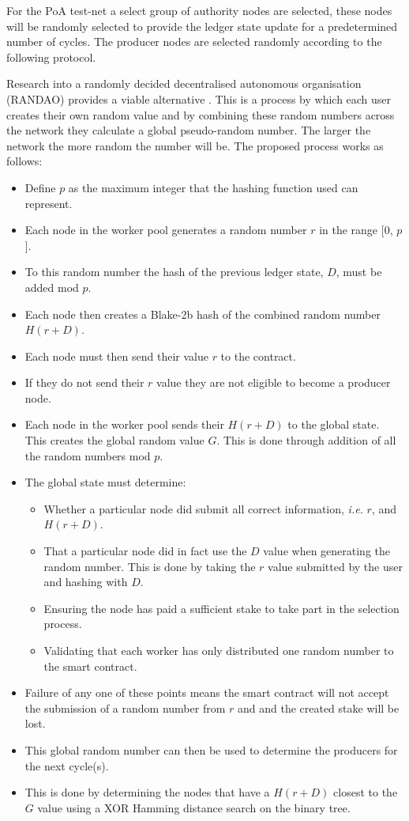 For the PoA test-net a select group of authority nodes are selected, these nodes will be randomly selected to provide the ledger state update for a predetermined number of cycles. The producer nodes are selected randomly according to the following protocol. 

Research into a randomly decided decentralised autonomous organisation (RANDAO) provides a viable alternative \cite{skvorc}\cite{randao}. This is a process by which each user creates their own random value and by combining these random numbers across the network they calculate a global pseudo-random number. The larger the network the more random the number will be. The proposed process works as follows: \\

\begin{itemize}

\item Define $p$ as the maximum integer that the hashing function used can represent.
\item Each node in the worker pool generates a random number $r$ in the range [0, $p$].
\item To this random number the hash of the previous ledger state, $D$, must be added mod $p$.
\item Each node then creates a Blake-2b hash of the combined random number $H(r + D)$.
\item Each node must then send their value $r$ to the contract.
\item If they do not send their $r$ value they are not eligible to become a producer node.
\item Each node in the worker pool sends their $H(r + D)$ to the global state. This creates the global random value $G$. This is done through addition of all the random numbers mod $p$.
\item The global state must determine:
\begin{itemize}
\item Whether a particular node did submit all correct information, \textit{i.e.} $r$, and $H(r+D)$.
\item That a particular node did in fact use the $D$ value when generating the random number. This is done by taking the $r$ value submitted by the user and hashing with $D$.
\item Ensuring the node has paid a sufficient stake to take part in the selection process.
\item Validating that each worker has only distributed one random number to the smart contract.
\end{itemize}
\item Failure of any one of these points means the smart contract will not accept the submission of a random number from $r$ and and the created stake will be lost.
\item This global random number can then be used to determine the producers for the next cycle(s).
\item This is done by determining the nodes that have a $H(r + D)$ closest to the $G$ value using a XOR Hamming distance search on the binary tree.\\

\end{itemize}

